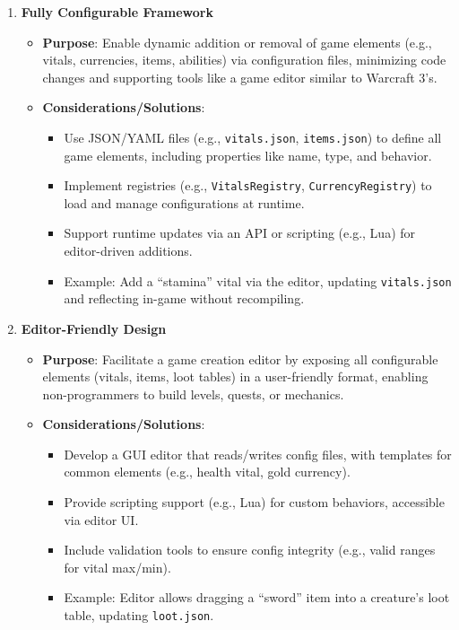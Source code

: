 \begin{enumerate}
    \item \textbf{Fully Configurable Framework}
        \begin{itemize}
            \item \textbf{Purpose}: Enable dynamic addition or removal of game elements (e.g., vitals, currencies, items, abilities) via configuration files, minimizing code changes and supporting tools like a game editor similar to Warcraft 3’s.
            \item \textbf{Considerations/Solutions}:
                \begin{itemize}
                    \item Use JSON/YAML files (e.g., \texttt{vitals.json}, \texttt{items.json}) to define all game elements, including properties like name, type, and behavior.
                    \item Implement registries (e.g., \texttt{VitalsRegistry}, \texttt{CurrencyRegistry}) to load and manage configurations at runtime.
                    \item Support runtime updates via an API or scripting (e.g., Lua) for editor-driven additions.
                    \item Example: Add a ``stamina'' vital via the editor, updating \texttt{vitals.json} and reflecting in-game without recompiling.
                \end{itemize}
        \end{itemize}

    \item \textbf{Editor-Friendly Design}
        \begin{itemize}
            \item \textbf{Purpose}: Facilitate a game creation editor by exposing all configurable elements (vitals, items, loot tables) in a user-friendly format, enabling non-programmers to build levels, quests, or mechanics.
            \item \textbf{Considerations/Solutions}:
                \begin{itemize}
                    \item Develop a GUI editor that reads/writes config files, with templates for common elements (e.g., health vital, gold currency).
                    \item Provide scripting support (e.g., Lua) for custom behaviors, accessible via editor UI.
                    \item Include validation tools to ensure config integrity (e.g., valid ranges for vital max/min).
                    \item Example: Editor allows dragging a ``sword'' item into a creature’s loot table, updating \texttt{loot.json}.
                \end{itemize}
        \end{itemize}


\end{enumerate}
